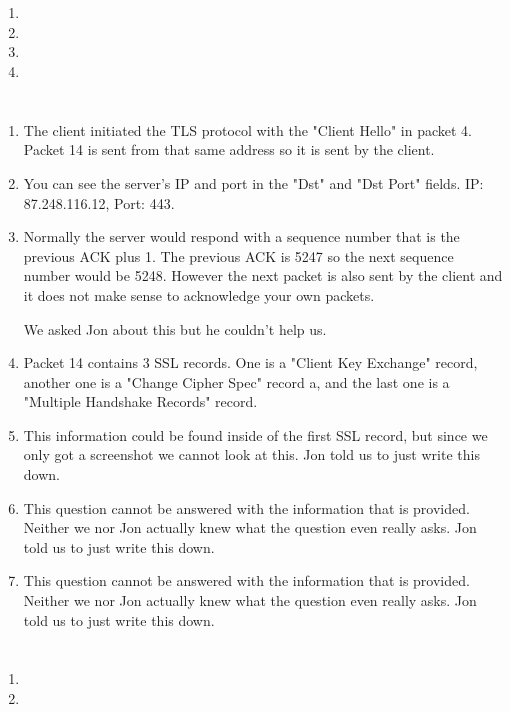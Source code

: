 \documentclass[12pt, a4paper]{article}
\begin{document}
\section{} %

\section{} %
\begin{enumerate}[a]
	\item %
	\item %
	\item %
	\item %
\end{enumerate}

\section{} %
\begin{enumerate}[a]
	\item %
	The client initiated the TLS protocol with the "Client Hello" in packet 4. Packet 14 is sent from that same address so it is sent by the client.
	\item %
	You can see the server's IP and port in the "Dst" and "Dst Port" fields. IP: 87.248.116.12, Port: 443.
	\item %
	Normally the server would respond with a sequence number that is the previous ACK plus 1. The previous ACK is 5247 so the next sequence number would be 5248. However the next packet is also sent by the client and it does not make sense to acknowledge your own packets.

	We asked Jon about this but he couldn't help us.
	\item %
	Packet 14 contains 3 SSL records. One is a "Client Key Exchange" record, another one is a "Change Cipher Spec" record a, and the last one is a "Multiple Handshake Records" record.
	\item %
	This information could be found inside of the first SSL record, but since we only got a screenshot we cannot look at this. Jon told us to just write this down.
	\item %
	This question cannot be answered with the information that is provided. Neither we nor Jon actually knew what the question even really asks. Jon told us to just write this down.
	\item %
	This question cannot be answered with the information that is provided. Neither we nor Jon actually knew what the question even really asks. Jon told us to just write this down.
\end{enumerate}

\section{} %
\begin{enumerate}[a]
	\item %
	\item %
\end{enumerate}
\end{document}
